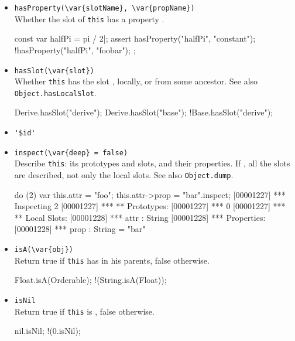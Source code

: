\begin{itemize}
\item \lstinline|hasProperty(\var{slotName}, \var{propName})|\\
  Whether the slot  of \lstinline|this| has a property
  .
\begin{urbiscript}
const var halfPi = pi / 2|;
assert
{
  hasProperty("halfPi", "constant");
  !hasProperty("halfPi", "foobar");
};
\end{urbiscript}

\item \lstinline|hasSlot(\var{slot})|\\
  Whether \lstinline|this| has the slot , locally, or from
  some ancestor.  See also \lstinline|Object.hasLocalSlot|.

\begin{urbiassert}
Derive.hasSlot("derive");
Derive.hasSlot("base");
!Base.hasSlot("derive");
\end{urbiassert}

\item \lstinline|'$id'|\\ %

\item \lstinline|inspect(\var{deep} = false)|\\
  Describe \lstinline|this|: its prototypes and slots, and their
  properties.  If , all the slots are described, not only
  the local slots. See also \lstinline|Object.dump|.
\begin{urbiscript}
do (2) { var this.attr = "foo"; this.attr->prop = "bar"}.inspect;
[00001227] *** Inspecting 2
[00001227] *** ** Prototypes:
[00001227] ***   0
[00001227] *** ** Local Slots:
[00001228] ***   attr : String
[00001228] ***     Properties:
[00001228] ***      prop : String = "bar"
\end{urbiscript}

\item \lstinline|isA(\var{obj})|\\
  Return true if \lstinline|this| has  in his parents, false
  otherwise.
\begin{urbiassert}
Float.isA(Orderable);
!(String.isA(Float));
\end{urbiassert}

\item \lstinline|isNil|\\
  Return true if \lstinline|this| is , false otherwise.
\begin{urbiassert}
nil.isNil;
!(0.isNil);
\end{urbiassert}


\end{itemize}
